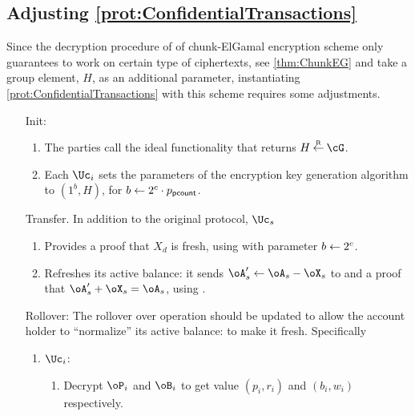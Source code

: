 \subsection{Adjusting  \cref{prot:ConfidentialTransactions}}\label{sec:ChanksEg:Adjusting}
Since the decryption procedure of of chunk-ElGamal  encryption scheme only guarantees to work on certain type of ciphertexts, see \cref{thm:ChunkEG} and take a group element, \ie $H$, as an additional parameter,  instantiating \cref{prot:ConfidentialTransactions} with this scheme  requires some adjustments.

\begin{enumerate}
	
	\item[Init:] 
	\begin{enumerate}
		\item The parties  call the ideal functionality \randomH that returns $H \getsr \cG$.
		\item 	Each $\Uc_i$ sets the parameters of the encryption key generation algorithm to $(1^b,H)$, for  $b \leftarrow 2^{c}\cdot p_{\mathsf{pcount}}$.

	\end{enumerate}
 
	\item[Transfer.]   In addition to the original protocol, $\Uc_s$
	\begin{enumerate}
		\item Provides a proof that $X_d$ is fresh, \ie using \pZK{\rtFsh} with parameter $b\leftarrow 2^c$.
		
		\item Refreshes its active balance: it sends $\oA_s' \asn \oA_s - \oX_s$ to \Cc and a proof 
			that $\oA_s' + \oX_s = \oA_s$, using   \pZK{\rEqSk}.
			
	\end{enumerate}
	
	
	
	
	
	\item[Rollover:] The rollover over operation should be updated to allow the account holder to ``normalize''  its active balance: to make it fresh. Specifically
	
	\begin{enumerate}
		\item $\Uc_i$:
		
		\begin{enumerate}
			\item Decrypt $\oP_i$ and $\oB_i$ to get value $(p_i,r_i)$ and $(b_i,w_i)$ respectively.
			

\end{enumerate}
\end{enumerate}
\end{enumerate}
